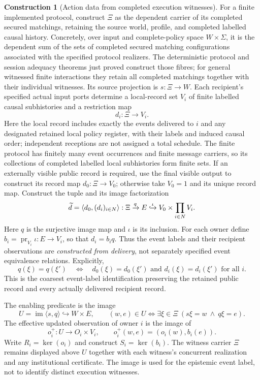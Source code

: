 \documentclass[11pt,a4paper]{article}
\numberwithin{equation}{section}
\theoremstyle{definition}
\newtheorem{construction}[construction]{Construction}
\theoremstyle{remark}
\theoremstyle{plain}
\providecommand{\im}{\mathop{\mathrm{im}}}
\providecommand{\kerpair}{\mathop{\mathrm{ker}}}
\begin{document}
\begin{construction}[Action data from completed execution witnesses]
\label{agt-con-witnessed-action-data}
For a finite implemented protocol, construct $\Xi$ as the dependent
carrier of its completed secured matchings, retaining the source world,
profile, and completed labelled causal history.  Concretely, over input
and complete-policy space $W\times\Sigma$, it is the dependent sum
of the sets of completed secured matching configurations associated
with the specified protocol realizers.  The deterministic
protocol and session adequacy theorems just proved construct those fibres; for
general witnessed finite interactions they retain all completed
matchings together with their individual witnesses. Its source projection is
$s:\Xi\to W$.  Each recipient's specified actual input ports determine
a local-record set $V_i$ of finite labelled causal subhistories and a
restriction map
\[
 d_i:\Xi\longrightarrow V_i.
\]
Here the local record includes exactly the events delivered to $i$
and any designated retained local policy register, with their labels
and induced causal order; independent receptions are not assigned a total
schedule.  The finite protocol has finitely many event occurrences and
finite message carriers, so its collections of completed labelled local
subhistories form finite sets.  If an externally visible public
record is required, use the final visible output to construct its
record map $d_0:\Xi\to V_0$; otherwise take $V_0=1$ and its unique
record map.  Construct the tuple and its image factorization
\[
 \widetilde d=\langle d_0,(d_i)_{i\in N}\rangle:
 \Xi\xrightarrow{q} E\lhook\joinrel\xrightarrow{\iota}
 V_0\times\prod_{i\in N}V_i.
\]
Here $q$ is the surjective image map and $\iota$ is its inclusion.
For each owner define $b_i=\operatorname{pr}_{V_i}\iota:E\to V_i$,
so that $d_i=b_iq$.  Thus the event labels and
their recipient observations are \emph{constructed from delivery}, not
separately specified event equivalence relations.  Explicitly,
\[
 q(\xi)=q(\xi')
 \quad\Longleftrightarrow\quad
 d_0(\xi)=d_0(\xi')\text{ and }
 d_i(\xi)=d_i(\xi')\text{ for all }i.
\]
This is the coarsest event-label identification preserving the retained
public record and every actually delivered recipient record.

The enabling predicate is the image
\[
 U=\im\langle s,q\rangle\hookrightarrow W\times E,
 \qquad (w,e)\in U\iff
 \exists\xi\in\Xi\ (s\xi=w\ \wedge\ q\xi=e).
\]
The effective updated observation of owner $i$ is the image of
\[
 o_i^+:U\to O_i\times V_i,
 \qquad o_i^+(w,e)=(o_i(w),b_i(e)).
\]
Write $R_i=\kerpair(o_i)$ and construct
$S_i=\kerpair(b_i)$.  The witness carrier $\Xi$ remains displayed above
$U$ together with each witness's concurrent realization and any
institutional certificate.  The image is used for the epistemic event
label, not to identify distinct execution witnesses.
\end{construction}
\end{document}
